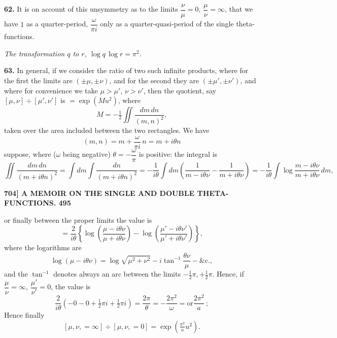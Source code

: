 \documentclass[11pt]{article}
\begin{document}
\medskip
\textbf{62.} It is on account of this unsymmetry as to the limits $\dfrac{\nu}{\mu}=0$, $\dfrac{\mu}{\nu}=\infty$, that we have $1$ as a quarter-period, $\dfrac{\omega}{\pi i}$ only as a quarter-quasi-period of the single theta-functions.

\medskip
\begin{center}\textit{The transformation $q$ to $r$, $\log q\,\log r = \pi^2$.}\end{center}

\textbf{63.} In general, if we consider the ratio of two such infinite products, where for the first the limits are $(\pm\mu,\pm\nu)$, and for the second they are $(\pm\mu',\pm\nu')$, and where for convenience we take $\mu > \mu'$, $\nu > \nu'$, then the quotient, say $[\mu,\nu] \div [\mu',\nu']$ is $= \exp(Mu^2)$, where
\[
M = -\tfrac{1}{2}\!\iint\!\frac{dm\,dn}{(m,n)^2},
\]
taken over the area included between the two rectangles. We have
\[
(m,n) = m + \frac{\omega}{\pi i}\,n = m + i\theta n
\]
suppose, where ($\omega$ being negative) $\theta = -\dfrac{\omega}{\pi}$ is positive: the integral is
\[
\iint\frac{dm\,dn}{(m+i\theta n)^2} = \int dm\!\int\!\frac{dn}{(m+i\theta n)^2} = -\frac{1}{i\theta}\!\int\!dm\!\left(\frac{1}{m-i\theta\nu} - \frac{1}{m+i\theta\nu}\right) = -\frac{1}{i\theta}\!\int\!\log\frac{m-i\theta\nu}{m+i\theta\nu}\,dm,
\]

\bigskip
\noindent\textbf{704] \hfill A MEMOIR ON THE SINGLE AND DOUBLE THETA-FUNCTIONS. \hfill 495}

\medskip
or finally between the proper limits the value is
\[
= \frac{2}{i\theta}\!\left\{\log\!\left(\frac{\mu-i\theta\nu}{\mu+i\theta\nu}\right) - \log\!\left(\frac{\mu'-i\theta\nu'}{\mu'+i\theta\nu'}\right)\right\},
\]
where the logarithms are
\[
\log(\mu - i\theta\nu) = \log\sqrt{\mu^2 + \nu^2} - i\tan^{-1}\frac{\theta\nu}{\mu} - \&\text{c.},
\]
and the $\tan^{-1}$ denotes always an arc between the limits $-\tfrac{1}{2}\pi, +\tfrac{1}{2}\pi$. Hence, if $\dfrac{\mu}{\nu}=\infty$, $\dfrac{\mu'}{\nu'}=0$, the value is
\[
\frac{2}{i\theta}(-0 - 0 + \tfrac{1}{2}\pi i + \tfrac{1}{2}\pi i) = \frac{2\pi}{\theta} = -\frac{2\pi^2}{\omega} = \text{or}\frac{2\pi^2}{a}\,;
\]
Hence finally
\[
[\mu,\nu, =\infty] \div [\mu,\nu, =0] = \exp\!\left(\tfrac{\pi^2}{a}u^2\right).
\]
\end{document}
